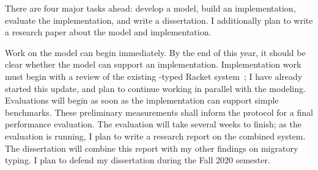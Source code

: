 There are four major tasks ahead:
  develop a model,
  build an implementation,
  evaluate the implementation,
  and write a dissertation.
I additionally plan to write a research paper about the model and
 implementation.

Work on the model can begin immediately.
By the end of this year, it should be clear whether the model can support
 an implementation.
Implementation work must begin with a review of the existing
 \tshallow{}-typed Racket system~\cite{gf-icfp-2018};
 I have already started this update, and plan to continue working in parallel
 with the modeling.
Evaluations will begin as soon as the implementation can support simple
 benchmarks.
These preliminary measurements shall inform the protocol for a final
 performance evaluation.
The evaluation will take several weeks to finish;
 as the evaluation is running, I plan to write a research report on the
 combined system.
The dissertation will combine this report with my other findings on
 migratory typing.
I plan to defend my dissertation during the Fall 2020 semester.

